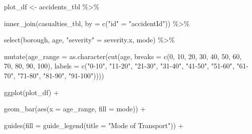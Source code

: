 \documentclass[
]{article}
\newenvironment{Shaded}{\begin{snugshade}}{\end{snugshade}}
\newcommand{\AttributeTok}[1]{\textcolor[rgb]{0.77,0.63,0.00}{#1}}
\newcommand{\DecValTok}[1]{\textcolor[rgb]{0.00,0.00,0.81}{#1}}
\newcommand{\FunctionTok}[1]{\textcolor[rgb]{0.00,0.00,0.00}{#1}}
\newcommand{\NormalTok}[1]{#1}
\newcommand{\OtherTok}[1]{\textcolor[rgb]{0.56,0.35,0.01}{#1}}
\newcommand{\SpecialCharTok}[1]{\textcolor[rgb]{0.00,0.00,0.00}{#1}}
\newcommand{\StringTok}[1]{\textcolor[rgb]{0.31,0.60,0.02}{#1}}
\begin{document}
\begin{Shaded}
\begin{Highlighting}[]
\NormalTok{plot\_df }\OtherTok{\textless{}{-}}\NormalTok{ accidents\_tbl }\SpecialCharTok{\%\textgreater{}\%}
    
    \FunctionTok{inner\_join}\NormalTok{(casualties\_tbl, }
               \AttributeTok{by =} \FunctionTok{c}\NormalTok{(}\StringTok{"id"} \OtherTok{=} \StringTok{"accidentId"}\NormalTok{)) }\SpecialCharTok{\%\textgreater{}\%}
    
    \FunctionTok{select}\NormalTok{(borough, }
\NormalTok{           age, }
           \StringTok{"severity"} \OtherTok{=}\NormalTok{ severity.x, }
\NormalTok{           mode) }\SpecialCharTok{\%\textgreater{}\%}
    
    \FunctionTok{mutate}\NormalTok{(}\AttributeTok{age\_range =} \FunctionTok{as.character}\NormalTok{(}\FunctionTok{cut}\NormalTok{(age,}
                                        \AttributeTok{breaks =} \FunctionTok{c}\NormalTok{(}\DecValTok{0}\NormalTok{, }\DecValTok{10}\NormalTok{, }\DecValTok{20}\NormalTok{, }\DecValTok{30}\NormalTok{, }\DecValTok{40}\NormalTok{, }\DecValTok{50}\NormalTok{,}
                                                   \DecValTok{60}\NormalTok{, }\DecValTok{70}\NormalTok{, }\DecValTok{80}\NormalTok{, }\DecValTok{90}\NormalTok{, }\DecValTok{100}\NormalTok{),}
                                        \AttributeTok{labels =} \FunctionTok{c}\NormalTok{(}\StringTok{"0{-}10"}\NormalTok{, }\StringTok{"11{-}20"}\NormalTok{,}
                                                   \StringTok{"21{-}30"}\NormalTok{, }\StringTok{"31{-}40"}\NormalTok{,}
                                                   \StringTok{"41{-}50"}\NormalTok{, }\StringTok{"51{-}60"}\NormalTok{,}
                                                   \StringTok{"61{-}70"}\NormalTok{, }\StringTok{"71{-}80"}\NormalTok{,}
                                                   \StringTok{"81{-}90"}\NormalTok{, }\StringTok{"91{-}100"}\NormalTok{))))}
  
  
  \FunctionTok{ggplot}\NormalTok{(plot\_df) }\SpecialCharTok{+}
    
    \FunctionTok{geom\_bar}\NormalTok{(}\FunctionTok{aes}\NormalTok{(}\AttributeTok{x =}\NormalTok{ age\_range, }
                 \AttributeTok{fill =}\NormalTok{ mode)) }\SpecialCharTok{+}
    
    \FunctionTok{guides}\NormalTok{(}\AttributeTok{fill =} \FunctionTok{guide\_legend}\NormalTok{(}\AttributeTok{title =} \StringTok{"Mode of Transport"}\NormalTok{)) }\SpecialCharTok{+}
    

\end{Highlighting}
\end{Shaded}
\end{document}
